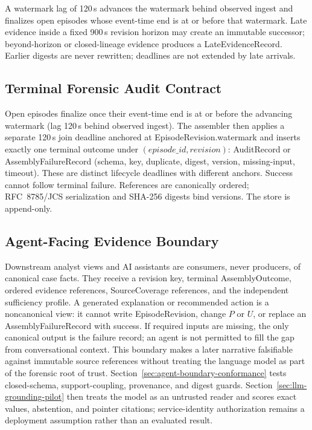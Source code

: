 A watermark lag of 120\,s advances the watermark behind observed ingest and finalizes open
episodes whose event-time end is at or before that watermark. Late evidence inside a fixed 900\,s
revision horizon may create an immutable successor; beyond-horizon or closed-lineage evidence
produces a LateEvidenceRecord. Earlier digests are never rewritten; deadlines are not extended by
late arrivals.

\subsection{Terminal Forensic Audit Contract}
\label{sec:audit-assembly}

Open episodes finalize once their event-time end is at or before the advancing watermark (lag
120\,s behind observed ingest). The assembler then applies a separate 120\,s join deadline
anchored at EpisodeRevision.watermark and inserts exactly one terminal outcome under
$(episode\_id,revision)$: AuditRecord or AssemblyFailureRecord (schema, key, duplicate, digest,
version, missing-input, timeout). These are distinct lifecycle deadlines with different anchors.
Success cannot follow terminal failure. References are canonically ordered; RFC~8785/JCS
serialization and SHA-256 digests bind versions. The store is append-only.

\subsection{Agent-Facing Evidence Boundary}
\label{sec:agent-boundary}

Downstream analyst views and AI assistants are consumers, never producers, of canonical case
facts. They receive a revision key, terminal AssemblyOutcome, ordered evidence references,
SourceCoverage references, and the independent sufficiency profile. A generated explanation or
recommended action is a noncanonical view: it cannot write EpisodeRevision, change $P$ or $U$, or
replace an AssemblyFailureRecord with success. If required inputs are missing, the only canonical
output is the failure record; an agent is not permitted to fill the gap from conversational
context. This boundary makes a later narrative falsifiable against immutable source references
without treating the language model as part of the forensic root of trust.
Section~\ref{sec:agent-boundary-conformance} tests closed-schema, support-coupling, provenance,
and digest guards. Section~\ref{sec:llm-grounding-pilot} then treats the model as an untrusted
reader and scores exact values, abstention, and pointer citations; service-identity authorization
remains a deployment assumption rather than an evaluated result.

